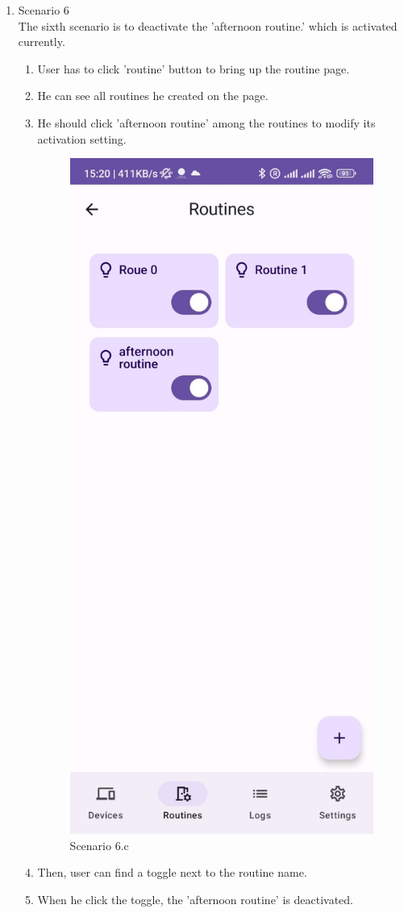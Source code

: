 \begin{enumerate}
    \item Scenario 6\\
    The sixth scenario is to deactivate the 'afternoon routine.' which is activated currently.\\
    \begin{enumerate}
        \item User has to click 'routine' button to bring up the routine page.\\
        \item He can see all routines he created on the page.\\
        \item He should click 'afternoon routine' among the routines to modify its activation setting.\\
        \begin{figure}
            \centering
            \includegraphics[width=0.5\linewidth]{imgs//usercase/scenario6-a.jpg}
            \caption{Scenario 6.c}
            \label{fig:enter-label}
        \end{figure}
        \item Then, user can find a toggle next to the routine name.\\
        \item When he click the toggle, the 'afternoon routine' is deactivated.\\

\end{enumerate}
\end{enumerate}
